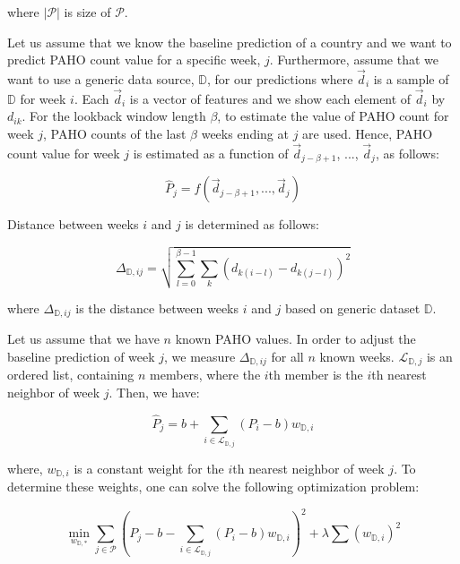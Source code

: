 where $|\mathcal{P}|$ is size of $\mathcal{P}$. 

Let us assume that we know the baseline prediction of a country and we want to predict PAHO count value for a specific week, $j$. Furthermore, assume that we want to use a generic data source, $\mathbb{D}$, for our predictions where $\vec{d}_i$ is a sample of $\mathbb{D}$ for week $i$. Each $\vec{d}_i$ is a vector of features and we show each element of $\vec{d}_i$ by $d_{ik}$. For the lookback window length $\beta$, to estimate the value of PAHO count for week $j$, PAHO counts of the last $\beta$ weeks ending at $j$ are used. Hence, PAHO count value for week $j$ is estimated as a function of $\vec{d}_{j-\beta+1}$, ..., $\vec{d}_{j}$, as follows:

\begin{equation}
\hat{P}_{j} = \mathit{f}(\vec{d}_{j-\beta+1},...,\vec{d}_{j})
\end{equation}

Distance between weeks $i$ and $j$ is determined as follows:

\begin{equation}
\Delta_{\mathbb{D},ij} = \sqrt{\sum_{l=0}^{\beta-1} \sum_{k} (d_{k(i-l)}-d_{k(j-l)})^2}
\end{equation}

where $\Delta_{\mathbb{D},ij}$ is the distance between weeks $i$ and $j$ based on generic dataset $\mathbb{D}$.

Let us assume that we have $n$ known PAHO values. In order to adjust the baseline prediction of week $j$, we measure $\Delta_{\mathbb{D},ij}$ for all $n$ known weeks. $\mathcal{L}_{\mathbb{D},j}$ is an ordered list, containing $n$ members, where the $i$th member is the $i$th nearest neighbor of week $j$. Then, we have:

\begin{equation}
\hat{P}_{j} = b + \sum_{i \in \mathcal{L}_{\mathbb{D},j}}{} (P_i - b)w_{\mathbb{D},i}
\label{eq:onesource}
\end{equation}

where, $w_{\mathbb{D},i}$ is a constant weight for the $i$th nearest neighbor of week $j$. To determine these weights, one can solve the following optimization problem:

\begin{equation}
\min_{w_{\mathbb{D},*}} \sum_{j \in \mathcal{P}} {(P_j - b - \sum_{i \in \mathcal{L}_{\mathbb{D},j}}{} (P_i - b)w_{\mathbb{D},i})^2} + \lambda \sum_{}{}{{(w_{\mathbb{D},i})}^2}
\end{equation}

